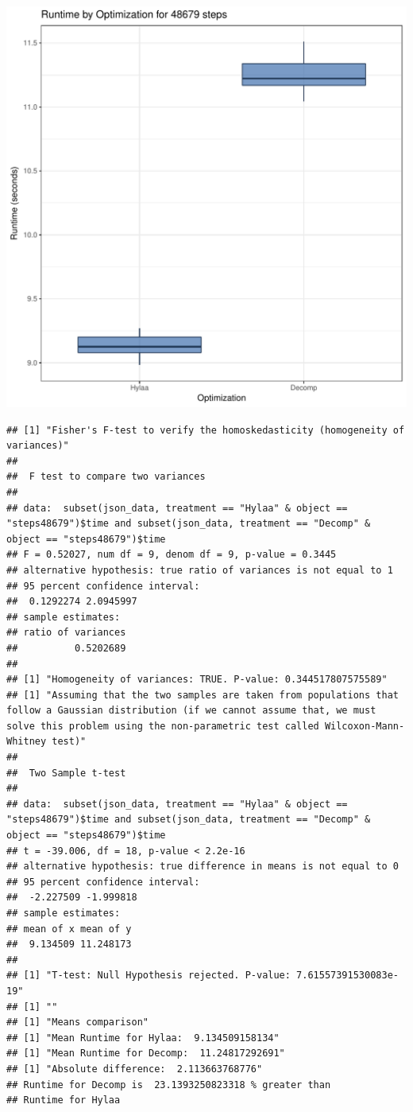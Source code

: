 \documentclass{article}\usepackage[]{graphicx}\usepackage[]{color}
\makeatletter
\def\maxwidth{ %
  \ifdim\Gin@nat@width>\linewidth
    \linewidth
  \else
    \Gin@nat@width
  \fi
}
\newenvironment{kframe}{%
 \def\at@end@of@kframe{}%
 \ifinner\ifhmode%
  \def\at@end@of@kframe{\end{minipage}}%
  \begin{minipage}{\columnwidth}%
 \fi\fi%
 \def\FrameCommand##1{\hskip\@totalleftmargin \hskip-\fboxsep
 \colorbox{shadecolor}{##1}\hskip-\fboxsep
     \hskip-\linewidth \hskip-\@totalleftmargin \hskip\columnwidth}%
 \MakeFramed {\advance\hsize-\width
   \@totalleftmargin\z@ \linewidth\hsize
   \@setminipage}}%
 {\par\unskip\endMakeFramed%
 \at@end@of@kframe}
\newenvironment{knitrout}{}{} %
\makeatother
\begin{document}
\begin{knitrout}
\color{fgcolor}
\includegraphics[width=\maxwidth]{figure/RH2_steps48679-1} 
\begin{kframe}\begin{verbatim}
## [1] "Fisher's F-test to verify the homoskedasticity (homogeneity of variances)"
## 
## 	F test to compare two variances
## 
## data:  subset(json_data, treatment == "Hylaa" & object == "steps48679")$time and subset(json_data, treatment == "Decomp" & object == "steps48679")$time
## F = 0.52027, num df = 9, denom df = 9, p-value = 0.3445
## alternative hypothesis: true ratio of variances is not equal to 1
## 95 percent confidence interval:
##  0.1292274 2.0945997
## sample estimates:
## ratio of variances 
##          0.5202689 
## 
## [1] "Homogeneity of variances: TRUE. P-value: 0.344517807575589"
## [1] "Assuming that the two samples are taken from populations that follow a Gaussian distribution (if we cannot assume that, we must solve this problem using the non-parametric test called Wilcoxon-Mann-Whitney test)"
## 
## 	Two Sample t-test
## 
## data:  subset(json_data, treatment == "Hylaa" & object == "steps48679")$time and subset(json_data, treatment == "Decomp" & object == "steps48679")$time
## t = -39.006, df = 18, p-value < 2.2e-16
## alternative hypothesis: true difference in means is not equal to 0
## 95 percent confidence interval:
##  -2.227509 -1.999818
## sample estimates:
## mean of x mean of y 
##  9.134509 11.248173 
## 
## [1] "T-test: Null Hypothesis rejected. P-value: 7.61557391530083e-19"
## [1] ""
## [1] "Means comparison"
## [1] "Mean Runtime for Hylaa:  9.134509158134"
## [1] "Mean Runtime for Decomp:  11.24817292691"
## [1] "Absolute difference:  2.113663768776"
## Runtime for Decomp is  23.1393250823318 % greater than 
## Runtime for Hylaa
\end{verbatim}
\end{kframe}
\end{knitrout}
\end{document}
